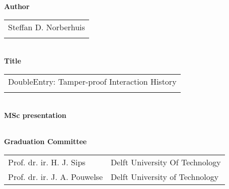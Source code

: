 \thispagestyle{empty}

\noindent \textbf{Author}\\
\begin{tabular}{l}
Steffan D. Norberhuis\\
\\
\end{tabular}\\
\noindent \textbf{Title}\\
\begin{tabular}{l}
DoubleEntry: Tamper-proof Interaction History\\
\\
\end{tabular}\\
\noindent \textbf{MSc presentation}\\
\begin{tabular}{l}
\\
\end{tabular}

\vspace{1.1cm}

\noindent \textbf{Graduation Committee}\\
\begin{tabular}{ll}
Prof. dr. ir. H. J. Sips            & Delft University Of Technology \\
Prof. dr. ir. J. A. Pouwelse        & Delft University of Technology \\
\end{tabular}


